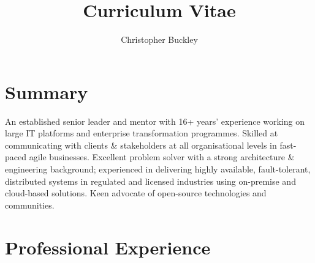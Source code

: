 \documentclass{cv}
\title{Curriculum Vitae}
\author{Christopher Buckley}
\begin{document}

\section{Summary}

An established senior leader and mentor with 16+ years' experience working on large IT platforms and
enterprise transformation programmes. Skilled at communicating with clients \& stakeholders at all
organisational levels in fast-paced agile businesses. Excellent problem solver with a strong
architecture \& engineering background; experienced in delivering highly available, fault-tolerant,
distributed systems in regulated and licensed industries using on-premise and cloud-based solutions.
Keen advocate of open-source technologies and communities.


\section{Professional Experience}
\end{document}
